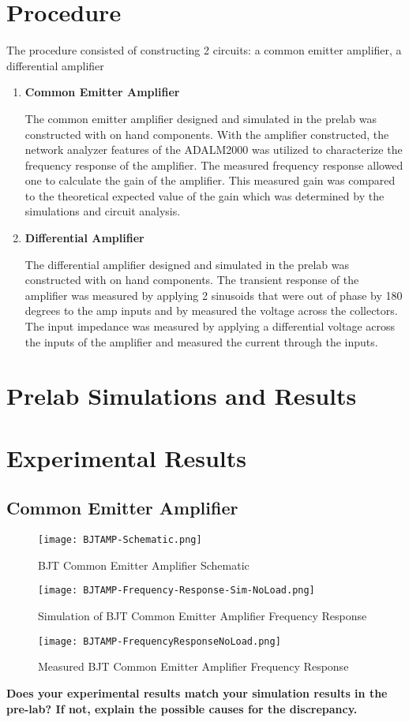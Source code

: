 \documentclass{article}
\begin{document}
\section*{Procedure}
The procedure consisted of constructing 2 circuits: a common emitter amplifier, a
differential amplifier
\begin{enumerate}
  \item \textbf{Common Emitter Amplifier}

  The common emitter amplifier designed and simulated in the prelab was constructed with on hand 
  components. With the amplifier constructed, the network analyzer features of the 
  ADALM2000 was utilized to characterize the frequency response of the amplifier. 
  The measured frequency response allowed one to calculate the gain of the amplifier.
  This measured gain was compared to the theoretical expected value of the gain which
  was determined by the simulations and circuit analysis. 
  \item \textbf{Differential Amplifier}

  The differential amplifier designed and simulated in the prelab was constructed with on hand 
  components. The transient response of the amplifier was measured by applying 2 
  sinusoids that were out of phase by 180 degrees to the amp inputs and by measured the
  voltage across the collectors. The input impedance was measured by applying a 
  differential voltage across the inputs of the amplifier and measured the current 
  through the inputs.
\end{enumerate}

\section*{Prelab Simulations and Results}

\section*{Experimental Results}
\subsection*{Common Emitter Amplifier}
\begin{figure}[H]
  \centering 
  \texttt{[image: BJTAMP-Schematic.png]} 
  \caption{ BJT Common Emitter Amplifier Schematic}
\end{figure}
\begin{figure}[H]
  \centering 
  \texttt{[image: BJTAMP-Frequency-Response-Sim-NoLoad.png]} 
  \caption{Simulation of BJT Common Emitter Amplifier Frequency Response}
\end{figure}
\begin{figure}[H]
  \centering 
  \texttt{[image: BJTAMP-FrequencyResponseNoLoad.png]} 
  \caption{Measured BJT Common Emitter Amplifier Frequency Response}
\end{figure}
\textbf{
 Does your experimental results match your simulation results in the
pre-lab? If not, explain the possible causes for the discrepancy.
}
\end{document}
